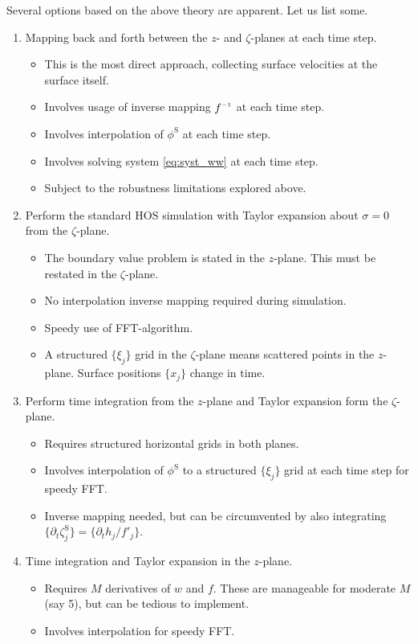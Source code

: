 \documentclass[a4paper,12pt]{article}
\newcommand{\mr}{\mathrm}
\renewcommand{\S}{^\mr{S}}
\renewcommand{\_}[1]{_\mr{#1}}
\newcommand{\w}{w}
\newcommand{\z}{z}
\newcommand{\x}{x}
\newcommand{\zz}{\zeta}
\newcommand{\xx}{\xi}
\newcommand{\yy}{\sigma}
\newcommand{\zmap}{f}
\newcommand{\zzmap}{\zmap^{\raisebox{.2ex}{$\scriptscriptstyle-1$}}}
\renewcommand{\w}{w}
\begin{document}
Several options based on the above theory are apparent.
Let us list some.
\renewcommand\labelitemi{--}
\begin{enumerate}[label={\roman*)}]
	\item Mapping back and forth between the $\z$- and $\zz$-planes at each time step.
	\begin{itemize}
		\item This  is the most direct approach, collecting surface velocities at the surface itself.
		\item Involves usage of inverse mapping $\zzmap$ at each time step.
		\item Involves interpolation of $\phi\S$ at each time step.
		\item Involves solving system \eqref{eq:syst_ww} at each time step.
		\item Subject to the robustness limitations explored above.
	\end{itemize}
	\item Perform the standard HOS simulation with Taylor expansion about $\yy=0$ from the $\zeta$-plane. \label{it:chosen}
	\begin{itemize}
		\item The boundary value problem is stated in the $\z$-plane. This must be restated in the $\zz$-plane.
		\item No interpolation inverse mapping required during simulation.
		\item Speedy use of FFT-algorithm.
		\item A structured $\{\xx_j\}$ grid in the $\zz$-plane means scattered points in the $\z$-plane. Surface positions $\{\x_j\}$ change in time.
	\end{itemize}
	\item Perform time integration from the $\z$-plane and Taylor expansion form the $\zz$-plane.
	\begin{itemize}
		\item Requires structured horizontal grids in both planes.
		\item Involves interpolation of $\phi\S$ to a structured $\{\xx_j\}$ grid at each time step for speedy FFT.
		\item Inverse mapping needed, but can be circumvented by also integrating $\{ \partial_t\zz\S_j\} = \{  \partial_t h_j /\zmap'_j\}$.
	\end{itemize}
	\item Time integration and Taylor expansion in the $\z$-plane.
	\begin{itemize}
		\item Requires $M$ derivatives of $\w$ and $\zmap$. These are manageable for moderate $M$ (say 5), but can be tedious to implement.
		\item Involves interpolation for speedy FFT.
	\end{itemize}
\end{enumerate}
\end{document}
